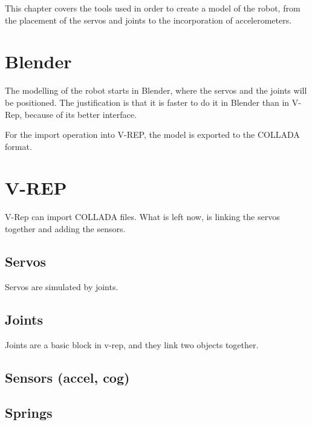 This chapter covers the tools used in order to create a model of the robot, from the placement of the servos and joints to the incorporation of accelerometers.

\section{Blender}
The modelling of the robot starts in Blender, where the servos and the joints will be positioned. The justification is that it is faster to do it in Blender than in V-Rep, because of its better interface. 

For the import operation into V-REP, the model is exported to the COLLADA format.

\section{V-REP}
V-Rep can import COLLADA files. What is left now, is linking the servos together and adding the sensors.
\subsection{Servos}
Servos are simulated by joints.
\subsection{Joints}
Joints are a basic block in v-rep, and they link two objects together. 

\subsection{Sensors (accel, cog)}
\subsection{Springs}
